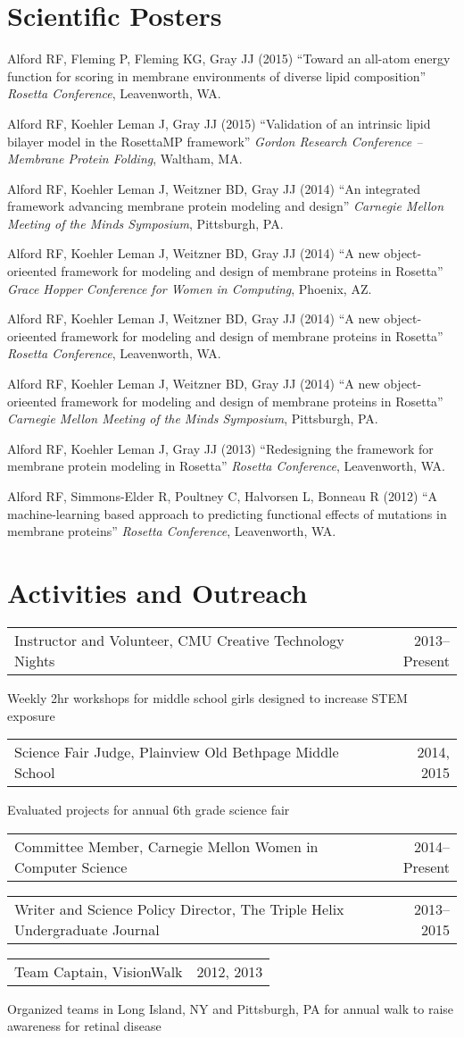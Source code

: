 \documentclass[11pt]{article}
\makeatletter
\newcommand{\allcapsspacing}[1]{{\addfontfeature{LetterSpace=7.5}#1}}
\newcommand{\leadershipitem}[3]{
\noindent
\begin{tabular*}{\textwidth}{@{\extracolsep{\fill}}lr}
		#1 & #2 \\
\end{tabular*}\newline#3\vspace{0.5\baselineskip}\par}
\newcommand{\yearitem}[2]{
\noindent
\begin{tabular*}{\textwidth}{@{\extracolsep{\fill}}lr}
		#1 & #2 \\
\end{tabular*}\vspace{0.3\baselineskip}}
\makeatother
\begin{document}
\section*{\allcapsspacing{Scientific Posters}}
\begin{etaremune}
\item Alford RF, Fleming P, Fleming KG, Gray JJ (2015) ``Toward an all-atom energy function for scoring in membrane environments of diverse lipid composition'' \textit{Rosetta Conference}, Leavenworth, WA.
\item Alford RF, Koehler Leman J, Gray JJ (2015) ``Validation of an intrinsic lipid bilayer model in the RosettaMP framework'' \textit{Gordon Research Conference -- Membrane Protein Folding}, Waltham, MA.
\item Alford RF, Koehler Leman J, Weitzner BD, Gray JJ (2014) ``An integrated framework advancing membrane protein modeling and design'' \textit{Carnegie Mellon Meeting of the Minds Symposium}, Pittsburgh, PA.
\item Alford RF, Koehler Leman J, Weitzner BD, Gray JJ (2014) ``A new object-orieented framework for modeling and design of membrane proteins in Rosetta'' \textit{Grace Hopper Conference for Women in Computing}, Phoenix, AZ.
\item Alford RF, Koehler Leman J, Weitzner BD, Gray JJ (2014) ``A new object-orieented framework for modeling and design of membrane proteins in Rosetta'' \textit{Rosetta Conference}, Leavenworth, WA.
\item Alford RF, Koehler Leman J, Weitzner BD, Gray JJ (2014) ``A new object-orieented framework for modeling and design of membrane proteins in Rosetta'' \textit{Carnegie Mellon Meeting of the Minds Symposium}, Pittsburgh, PA.
\item Alford RF, Koehler Leman J, Gray JJ (2013) ``Redesigning the framework for membrane protein modeling in Rosetta'' \textit{Rosetta Conference}, Leavenworth, WA.
\item Alford RF, Simmons-Elder R, Poultney C, Halvorsen L, Bonneau R (2012) ``A machine-learning based approach to predicting functional effects of mutations in membrane proteins'' \textit{Rosetta Conference}, Leavenworth, WA.
\end{etaremune}

\section*{\allcapsspacing{Activities and Outreach}}
\leadershipitem{Instructor and Volunteer, CMU Creative Technology Nights}{2013--Present}{Weekly 2hr workshops for middle school girls designed to increase STEM exposure}
\leadershipitem{Science Fair Judge, Plainview Old Bethpage Middle School}{2014, 2015}{Evaluated projects for annual 6th grade science fair}
\yearitem{Committee Member, Carnegie Mellon Women in Computer Science}{2014--Present}
\yearitem{Writer and Science Policy Director, The Triple Helix Undergraduate Journal}{2013--2015}
\leadershipitem{Team Captain, VisionWalk}{2012, 2013}{Organized teams in Long Island, NY and Pittsburgh, PA for annual walk to raise awareness for retinal disease}
\end{document}
